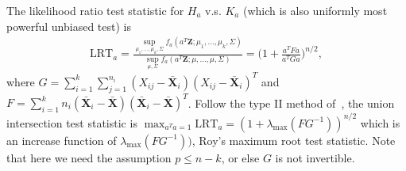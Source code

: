 \documentclass[review]{elsarticle}
\newcommand{\bZ}{\mathbf{Z}}
\theoremstyle{plain}
\theoremstyle{definition}
\theoremstyle{remark}
\begin{document}
The likelihood ratio test statistic for $H_a$ v.s. $K_a$ (which is also uniformly most powerful unbiased test) is
\begin{equation*}
    \begin{aligned}
        \text{LRT}_{a}=\frac{\sup\limits_{\mu_1,\ldots,\mu_k,\Sigma}f_a(a^T \bZ;\mu_1,\ldots,\mu_k,\Sigma)}{\sup\limits_{\mu,\Sigma}f_a(a^T \bZ;\mu,\ldots,\mu,\Sigma)}
        =
        \Big(1+\frac{a^T Fa}{a^T G a}\Big)^{n/2},
    \end{aligned}
\end{equation*}
where $G=\sum_{i=1}^k\sum_{j=1}^{n_i}(X_{ij}-\bar{\mathbf{X}}_i)(X_{ij}-\bar{\mathbf{X}}_i)^T$ and $F=\sum_{i=1}^k n_i (\bar{\mathbf{X}}_i-\bar{\mathbf{X}})(\bar{\mathbf{X}}_i-\bar{\mathbf{X}})^T$.
Follow the type II method of~\cite{Roy1953}, the union intersection test statistic is $\max_{a^T a=1}\text{LRT}_a=(1+\lambda_{\max}(FG^{-1}))^{n/2}$ which is an increase function of $\lambda_{\max}(FG^{-1}))$, Roy's maximum root test statistic.
Note that here we need the assumption $p\leq n-k$, or else $G$ is not invertible.
\end{document}
